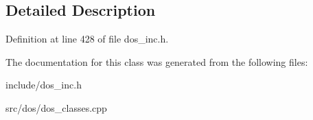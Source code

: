 \subsection{Detailed Description}


Definition at line 428 of file dos\-\_\-inc.\-h.



The documentation for this class was generated from the following files\-:\begin{DoxyCompactItemize}
\item 
include/dos\-\_\-inc.\-h\item 
src/dos/dos\-\_\-classes.\-cpp\end{DoxyCompactItemize}
